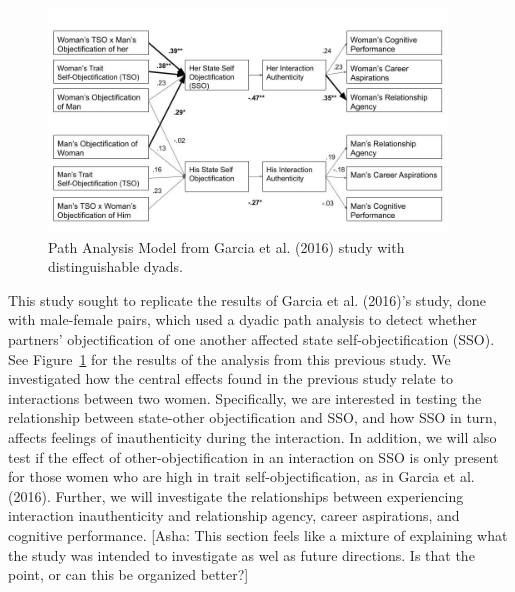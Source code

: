 \documentclass[man]{apa6}
\begin{document}
\begin{figure}
\includegraphics[width=400px]{2016_figure} \caption{Path Analysis Model from Garcia et al. (2016) study with distinguishable dyads.}\label{fig:2016figure}
\end{figure}

This study sought to replicate the results of Garcia et al. (2016)'s
study, done with male-female pairs, which used a dyadic path analysis to
detect whether partners' objectification of one another affected state
self-objectification (SSO). See Figure~\ref{fig:2016figure} for the
results of the analysis from this previous study. We investigated how
the central effects found in the previous study relate to interactions
between two women. Specifically, we are interested in testing the
relationship between state-other objectification and SSO, and how SSO in
turn, affects feelings of inauthenticity during the interaction. In
addition, we will also test if the effect of other-objectification in an
interaction on SSO is only present for those women who are high in trait
self-objectification, as in Garcia et al. (2016). Further, we will
investigate the relationships between experiencing interaction
inauthenticity and relationship agency, career aspirations, and
cognitive performance. {[}Asha: This section feels like a mixture of
explaining what the study was intended to investigate as wel as future
directions. Is that the point, or can this be organized better?{]}
\end{document}
